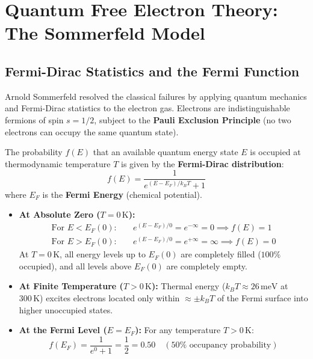 \section{Quantum Free Electron Theory: The Sommerfeld Model}
\subsection{Fermi-Dirac Statistics and the Fermi Function}
Arnold Sommerfeld resolved the classical failures by applying quantum mechanics and Fermi-Dirac statistics to the electron gas. Electrons are indistinguishable fermions of spin $s = 1/2$, subject to the \textbf{Pauli Exclusion Principle} (no two electrons can occupy the same quantum state).

The probability $f(E)$ that an available quantum energy state $E$ is occupied at thermodynamic temperature $T$ is given by the \textbf{Fermi-Dirac distribution}:
\begin{equation}
    f(E) = \frac{1}{e^{(E - E_F)/k_B T} + 1}
\end{equation}
where $E_F$ is the \textbf{Fermi Energy} (chemical potential).

\begin{conceptbox}
\begin{itemize}
    \item \textbf{At Absolute Zero ($T = 0\,\text{K}$):}
    \begin{align}
        \text{For } E < E_F(0): \quad & e^{(E-E_F)/0} = e^{-\infty} = 0 \implies f(E) = 1 \\
        \text{For } E > E_F(0): \quad & e^{(E-E_F)/0} = e^{+\infty} = \infty \implies f(E) = 0
    \end{align}
    At $T = 0\,\text{K}$, all energy levels up to $E_F(0)$ are completely filled ($100\%$ occupied), and all levels above $E_F(0)$ are completely empty.
    \item \textbf{At Finite Temperature ($T > 0\,\text{K}$):} Thermal energy ($k_B T \approx 26\,\text{meV}$ at $300\,\text{K}$) excites electrons located only within $\approx \pm k_B T$ of the Fermi surface into higher unoccupied states.
    \item \textbf{At the Fermi Level ($E = E_F$):} For any temperature $T > 0\,\text{K}$:
    \begin{equation}
        f(E_F) = \frac{1}{e^0 + 1} = \frac{1}{2} = 0.50 \quad (50\%\text{ occupancy probability})
    \end{equation}
\end{itemize}
\end{conceptbox}

